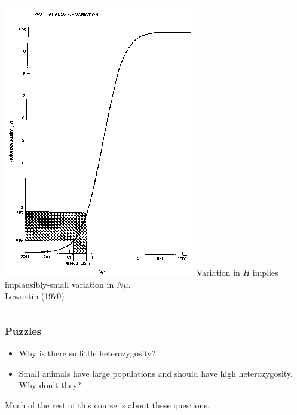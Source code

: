 \begin{frame}
\begin{columns}
\includegraphics[width=\linewidth]{parodvar.png}
Variation in $H$ implies implausibly-small variation in $N\mu$.\\[2ex]
\mbox{}\hfill {\small Lewontin (1970)\\} 
\end{columns}
\end{frame}

\begin{frame}
\frametitle{Puzzles}

\begin{itemize}
\item
Why is there so little heterozygosity?
\pause
\item
Small animals have large populations and should have high heterozygosity.
Why don't they?
\end{itemize}
\pause

\bigskip
Much of the rest of this course is about these questions.
\end{frame}

